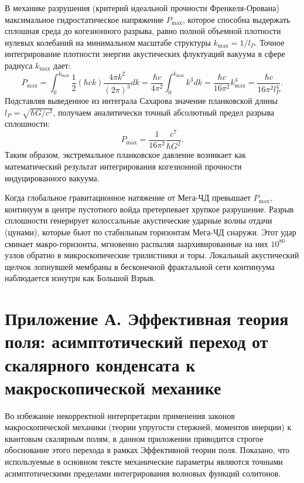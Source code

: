 \documentclass[11pt,a4paper]{article}
\begin{document}
	В механике разрушения (критерий идеальной прочности Френкеля-Орована) максимальное гидростатическое напряжение $P_{\text{max}}$, которое способна выдержать сплошная среда до когезионного разрыва, равно полной объемной плотности нулевых колебаний на минимальном масштабе структуры $k_{\text{max}} = 1/l_P$.
	Точное интегрирование плотности энергии акустических флуктуаций вакуума в сфере радиуса $k_{\text{max}}$ дает:
	\begin{equation}
		P_{\text{max}} = \int_0^{k_{\text{max}}} \frac{1}{2} (\hbar c k) \frac{4\pi k^2}{(2\pi)^3} dk = \frac{\hbar c}{4\pi^2} \int_0^{k_{\text{max}}} k^3 dk = \frac{\hbar c}{16\pi^2} k_{\text{max}}^4 = \frac{\hbar c}{16\pi^2 l_P^4}.
	\end{equation}
	Подставляя выведенное из интеграла Сахарова значение планковской длины $l_P = \sqrt{\hbar G / c^3}$, получаем аналитически точный абсолютный предел разрыва сплошности:
	\begin{equation}
		P_{\text{max}} = \frac{1}{16\pi^2} \frac{c^7}{\hbar G^2}.
	\end{equation}
	Таким образом, экстремальное планковское давление возникает как математический результат интегрирования когезионной прочности индуцированного вакуума.
	
	Когда глобальное гравитационное натяжение от Мега-ЧД превышает $P_{\text{max}}$, континуум в центре пустотного войда претерпевает хрупкое разрушение. Разрыв сплошности генерирует колоссальные акустические ударные волны отдачи (цунами), которые бьют по стабильным горизонтам Мега-ЧД снаружи. Этот удар сминает макро-горизонты, мгновенно распыляя заархивированные на них $10^{80}$ узлов обратно в микроскопические трилистники и торы. Локальный акустический щелчок лопнувшей мембраны в бесконечной фрактальной сети континуума наблюдается изнутри как Большой Взрыв.
	
	\section*{Приложение А. Эффективная теория поля: асимптотический переход от скалярного конденсата к макроскопической механике}
	Во избежание некорректной интерпретации применения законов макроскопической механики (теории упругости стержней, моментов инерции) к квантовым скалярным полям, в данном приложении приводится строгое обоснование этого перехода в рамках Эффективной теории поля. Показано, что используемые в основном тексте механические параметры являются точными асимптотическими пределами интегрирования волновых функций солитонов.
	
\end{document}
